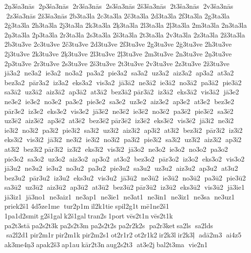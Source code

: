 2ņ3ša3nās  2p3ša3nās  2r3ša3nās  2s3ša3nās  
2š3ša3nās  2t3ša3nās  2v3ša3nās  2z3ša3nās  
2ž3ša3nās  	2b3ta3la  	2c3ta3la  
2č3ta3la  	2d3ta3la  	2f3ta3la  	2g3ta3la  
2ģ3ta3la  	2h3ta3la  	2j3ta3la  	2k3ta3la  
2ķ3ta3la  	2l3ta3la  
2ļ3ta3la  	2m3ta3la  	2n3ta3la  
2ņ3ta3la  	2p3ta3la  	2r3ta3la  	2s3ta3la  
2š3ta3la  	2t3ta3la  	2v3ta3la  	2z3ta3la  
2ž3ta3la  	2b3tu3ve  	2c3tu3ve  
2č3tu3ve  	2d3tu3ve  	2f3tu3ve  	2g3tu3ve  
2ģ3tu3ve  	2h3tu3ve  	2j3tu3ve  	2k3tu3ve  
2ķ3tu3ve  	2l3tu3ve  
2ļ3tu3ve  	2m3tu3ve  	2n3tu3ve  
2ņ3tu3ve  	2p3tu3ve  	2r3tu3ve  	2s3tu3ve  
2š3tu3ve  	2t3tu3ve  	2v3tu3ve  	2z3tu3ve  
2ž3tu3ve   jā3a2  ne3a2  ie3a2  no3a2  pa3a2  pie3a2  sa3a2  uz3a2  aiz3a2  ap3a2  at3a2  bez3a2  pār3a2  iz3a2  eks3a2  vis3a2  jā3ā2  ne3ā2  ie3ā2  no3ā2  pa3ā2  pie3ā2  sa3ā2  uz3ā2  aiz3ā2  ap3ā2  at3ā2  bez3ā2 	 pār3ā2  iz3ā2  eks3ā2  vis3ā2  jā3e2  ne3e2  ie3e2  no3e2  pa3e2  pie3e2  sa3e2  uz3e2  aiz3e2  ap3e2  at3e2  bez3e2  pār3e2  iz3e2  eks3e2  vis3e2  jā3ē2  ne3ē2  ie3ē2  no3ē2  pa3ē2  pie3ē2  sa3ē2  uz3ē2  aiz3ē2  ap3ē2  at3ē2  bez3ē2 	 pār3ē2  iz3ē2  eks3ē2  vis3ē2  jā3i2  ne3i2  ie3i2  no3i2  pa3i2  pie3i2  sa3i2  uz3i2  aiz3i2  ap3i2  at3i2  bez3i2  pār3i2  iz3i2  eks3i2  vis3i2  jā3ī2  ne3ī2  ie3ī2  no3ī2  pa3ī2  pie3ī2  sa3ī2  uz3ī2  aiz3ī2  ap3ī2  at3ī2  bez3ī2 	 pār3ī2  iz3ī2  eks3ī2  vis3ī2  jā3o2  ne3o2  ie3o2  no3o2  pa3o2  pie3o2  sa3o2  uz3o2  aiz3o2  ap3o2  at3o2  bez3o2  pār3o2  iz3o2  eks3o2  vis3o2  jā3u2  ne3u2  ie3u2  no3u2  pa3u2  pie3u2  sa3u2  uz3u2  aiz3u2  ap3u2  at3u2  bez3u2  pār3u2  iz3u2  eks3u2  vis3u2  jā3ū2  ne3ū2  ie3ū2  no3ū2  pa3ū2  pie3ū2  sa3ū2  uz3ū2  aiz3ū2  ap3ū2  at3ū2  bez3ū2 	 pār3ū2  iz3ū2  eks3ū2  vis3ū2  jā3ie1  jā3iz1  jā3no1  ne3aiz1  ne3ap1  ne3ie1  ne3at1  ne3in1  ne3iz1  ne3sa  ne3uz1 
 priek2š1 4d5ze1me  tur2p1m il2k1tie 	 spil2g1t 
mē1ne2š1 
1pa1d2smit g2š1gal k2š1gal tran2s 1port vēs2t1n vēs2t1k 	pa2t3stā pa2s2t3k pa2s2t3m 	pa2s2t2s  	pa2r2k2s  pa2r3ket sa2ls  sa2lds  sa2l2d1 pir2m1r pir2m1k pir2m2s1 ot2r1r2 ot2r1k2 ir2k3l ir2k3ļ  adā2m3  ai4z5 	ak3me4ņ3 apak2š3 ap1au kār2t3n aug2s2t3  at3e2j bal2t3ma  vie2n1